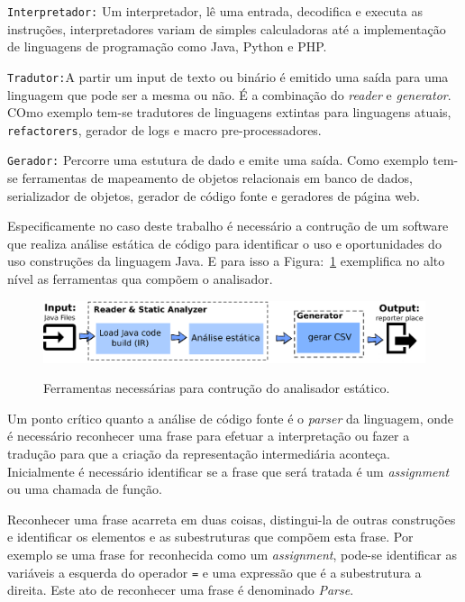 \texttt{Interpretador:} Um interpretador, lê uma entrada, decodifica e executa as instruções, interpretadores variam de simples calculadoras até a implementação de linguagens de programação como Java, Python e PHP.

\texttt{Tradutor:}A partir um input de texto ou binário é emitido uma saída para uma linguagem que pode ser a mesma ou não. É a combinação do \textit{reader} e \textit{generator}. COmo exemplo tem-se tradutores de linguagens extintas para linguagens atuais, \texttt{refactorers},  gerador de logs e macro pre-processadores.
	
\texttt{Gerador:} Percorre uma estutura de dado e emite uma saída. Como exemplo tem-se ferramentas de mapeamento de objetos relacionais em banco de dados, serializador de objetos, gerador de código fonte e geradores de página web.



Especificamente no caso deste trabalho é necessário a contrução de um software que realiza análise estática de código para identificar o uso e oportunidades do uso construções da linguagem Java. E para isso a Figura:~\ref{fig:stagesAnalyzer} exemplifica no alto nível as ferramentas qua compõem o analisador.

\begin{figure}[h]
	\center
	\includegraphics[scale=0.9]{Imagens/stagesAnalizer}
	\label{fig:stagesAnalyzer}
	\caption{Ferramentas necessárias para contrução do analisador estático.}
\end{figure}



{\color{red}{
Atualemente a evolução de uma linguagem de programação ocorre predominantemente de forma ad-hoc e em muitos casos manual, isso ocorre na tradução de aplicativos legados, 
}
}



Um ponto crítico quanto a análise de código fonte é o \textit{parser} da linguagem, onde é necessário reconhecer uma frase para efetuar a interpretação ou fazer a tradução para que a criação da representação intermediária aconteça. Inicialmente é necessário identificar se a frase que será tratada é um \textit{assignment} ou uma chamada de função.
 
Reconhecer uma frase acarreta em duas coisas, distingui-la de outras construções e identificar os elementos e as subestruturas que compõem esta frase. Por exemplo se uma frase for reconhecida como um \textit{assignment}, pode-se identificar as variáveis a esquerda do operador \texttt{=} e uma expressão que é a subestrutura a direita. Este ato de reconhecer uma frase é denominado \textit{Parse}.

